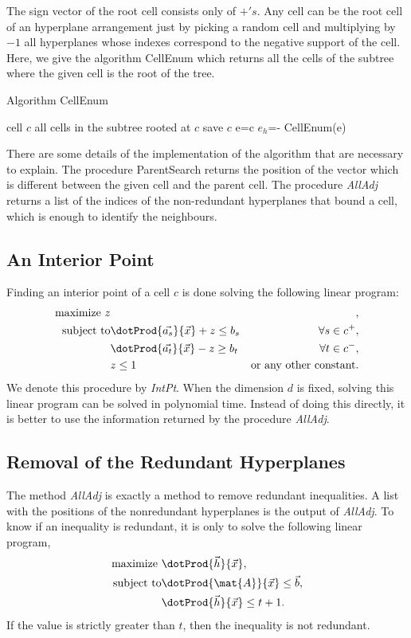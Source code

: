 The sign vector of the root cell consists only of $+'s$. Any cell
can be the root cell of an hyperplane arrangement just by picking
a random cell and multiplying by $-1$ all hyperplanes whose indexes 
correspond to the negative support of the cell. Here, we give the algorithm
CellEnum which returns all the cells of the subtree where the given cell
is the root of the tree.
\begin{algorithm}
  \caption{Algorithm CellEnum}
  \label{alg:CellEnum}
  \begin{algorithmic}
    \REQUIRE cell $c$ 
    \ENSURE all cells in the subtree rooted at $c$
    \STATE save $c$
    \STATE e=c
    \STATE $e_h$=-
    \STATE CellEnum(e)
    \ENDIF
    \ENDIF
    \ENDFOR
  \end{algorithmic}
\end{algorithm}
There are some details of the implementation of the algorithm that are 
necessary to explain.
The procedure ParentSearch returns the position of the vector which is different
between the given cell and the parent cell. The procedure \textit{AllAdj} returns
a list of the indices of the non-redundant hyperplanes that bound a cell, which
is enough to identify the neighbours.

\subsection{An Interior Point}
\label{sec:subInteriorPoint}
Finding an interior point of a cell $c$ is done solving the following linear program:
\begin{eqnarray*}
  \text{maximize }z&&,\\
  \text{subject to}&\dotProd{\vec{a_s}}{\vec{x}}+z\le b_s& \forall s\in c^+,\\
  &\dotProd{\vec{a_t}}{\vec{x}}-z\ge b_t& \forall t\in c^-,\\
  &z\le 1 &\text{or any other constant.}
\end{eqnarray*}
We denote this procedure by \textit{IntPt}.
When the dimension $d$ is fixed, solving this linear program can be solved in 
polynomial time. Instead of doing this directly, it is better to use the information
returned by the procedure \textit{AllAdj}. 
 
\subsection{Removal of the Redundant Hyperplanes}
The method \textit{AllAdj} is exactly a method to remove redundant inequalities. 
A list with the positions of the nonredundant hyperplanes  is the output of 
\textit{AllAdj}. To know if an inequality is redundant, it is only to 
solve the following linear program,
\begin{eqnarray*}
  \text{maximize }&\dotProd{\vec{h}}{\vec{x}},\\
  \text{subject to}&\dotProd{\mat{A}}{\vec{x}}\le \vec{b},\\
  &\dotProd{\vec{h}}{\vec{x}}\le t+1.\\
\end{eqnarray*}
If the value is strictly greater than $t$, then the inequality is not redundant.


